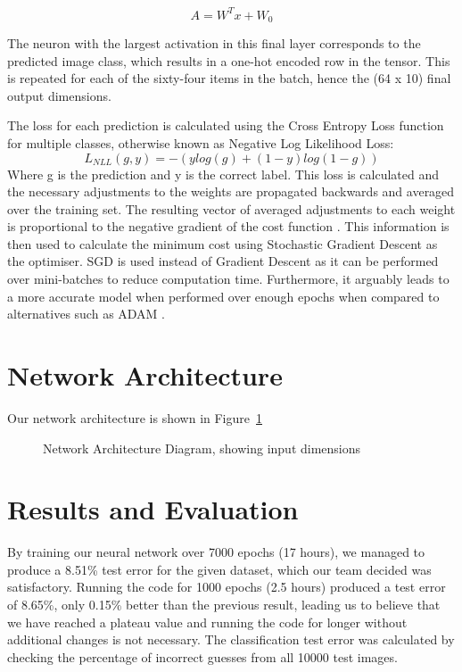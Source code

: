 \documentclass[journal]{IEEEtran}
\begin{document}
\begin{equation*}
    A = W^Tx + W_{0}
\end{equation*}

The neuron with the largest activation in this final layer corresponds to the predicted image class, which results in a one-hot encoded row in the tensor. This is repeated for each of the sixty-four items in the batch, hence the (64 x 10) final output dimensions.

The loss for each prediction is calculated using the  Cross Entropy Loss function for multiple classes, otherwise known as Negative Log Likelihood Loss:
\begin{equation*}
    L_{NLL}(g, y) = -(y log(g) + (1 - y) log(1 - g))
\end{equation*}
Where g is the prediction and y is the correct label. This loss is calculated and the necessary adjustments to the weights are propagated backwards and averaged over the training set. The resulting vector of averaged adjustments to each weight is proportional to the negative gradient of the cost function \cite{3b1b}. This information is then used to calculate the minimum cost using Stochastic Gradient Descent as the optimiser. SGD is used instead of Gradient Descent as it can be performed over mini-batches to reduce computation time. Furthermore, it arguably leads to a more accurate model when performed over enough epochs when compared to alternatives such as ADAM \cite{cifar10}.


\section{Network Architecture} 
Our network architecture is shown in Figure~\ref{diagram}
\begin{figure}[!h]
  \centering
  
  \caption{Network Architecture Diagram, showing input dimensions}
  \label{diagram}
\end{figure}


\section{Results and Evaluation}
By training our neural network over 7000 epochs (17 hours), we managed to produce a 8.51\% test error for the given dataset, which our team decided was satisfactory. Running the code for 1000 epochs (2.5 hours) produced a test error of 8.65\%, only 0.15\% better than the previous result, leading us to believe that we have reached a plateau value and running the code for longer without additional changes is not necessary. The classification test error was calculated by checking the percentage of incorrect guesses from all 10000 test images.
\end{document}

